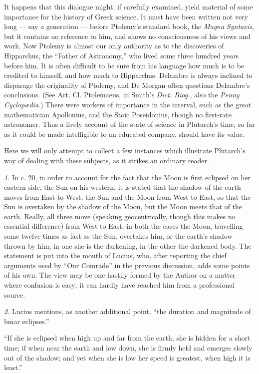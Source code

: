 \documentclass[a4paper, 11pt, oneside, polutonikogreek, english]{article}
\begin{document}
It happens that this dialogue might, if carefully examined, yield material of some importance for the history of Greek science. It must have been written not very long --- say a generation --- before Ptolemy's standard book, the \emph{Magna Syntaxis}, but it contains no reference to him, and shows no consciousness of his views and work. Now Ptolemy is almost our only authority as to the discoveries of Hipparchus, the ``Father of Astronomy,'' who lived some three hundred years before him. It is often difficult to be sure from his language how much is to be credited to himself, and how much to Hipparchus. Delambre is always inclined to disparage the originality of Ptolemy, and De Morgan often questions Delambre's conclusions. (See Art. Cl. Ptolemaeus, in Smith's \emph{Dict. Biog.}, also the \emph{Penny Cyclopædia}.) There were workers of importance in the interval, such as the great mathematician Apollonius, and the Stoic Poseidonius, though no first-rate astronomer. Thus a lively account of the state of science in Plutarch's time, so far as it could be made intelligible to an educated company, should have its value. 

Here we will only attempt to collect a few instances which illustrate Plutarch's way of dealing with these subjects, as it strikes an ordinary reader.

\emph{1.} In c. 20, in order to account for the fact that the Moon is first eclipsed on her eastern side, the Sun on his western, it is stated that the shadow of the earth moves from East to West, the Sun and the Moon from West to East, so that the Sun is overtaken by the shadow of the Moon, but the Moon meets that of the earth. Really, all three move (speaking geocentrically, though this makes no essential difference) from West to East; in both the cases the Moon, travelling some twelve times as fast as the Sun, overtakes him, or the earth's shadow thrown by him; in one she is the darkening, in the other the darkened body. The statement is put into the mouth of Lucius, who, after reporting the chief arguments used by ``Our Comrade'' in the previous discussion, adds some points of his own. The view may be one hastily formed by the Author on a matter where confusion is easy; it can hardly have reached him from a professional source.

\emph{2.} Lucius mentions, as another additional point, ``the duration and magnitude of lunar eclipses.''

``If she is eclipsed when high up and far from the earth, she is hidden for a short time; if when near the earth and low down, she is firmly held and emerges slowly out of the shadow; and yet when she is low her speed is greatest, when high it is least.''
\end{document}
